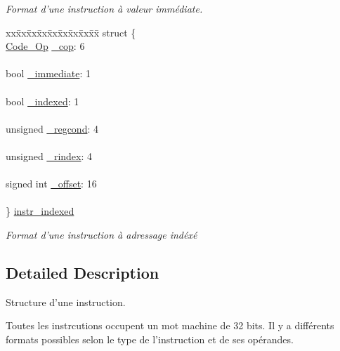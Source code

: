 \begin{DoxyCompactItemize}
\begin{tabbing}
\end{tabbing}\begin{DoxyCompactList}\small\item\em \-Format d'une instruction à valeur immédiate. \end{DoxyCompactList}\item 
\begin{tabbing}
xx\=xx\=xx\=xx\=xx\=xx\=xx\=xx\=xx\=\kill
struct \{\\
\>\hyperlink{instruction_8h_a5ead9d7413d75b14e895c945daa82de6}{Code\_Op} \hyperlink{union_instruction_a2eef4c29da07a7afefa510530aeabe8b}{\_cop}: 6\\
\>\\
\>bool \hyperlink{union_instruction_ae8f0aed9ccc5cc06e0689f32c409787d}{\_immediate}: 1\\
\>\\
\>bool \hyperlink{union_instruction_a49ff74dcae74d84b5fce96090bcbcd14}{\_indexed}: 1\\
\>\\
\>unsigned \hyperlink{union_instruction_aacc0d299ebbd857ec008b3c9e2ae2cd0}{\_regcond}: 4\\
\>\\
\>unsigned \hyperlink{union_instruction_a5b83cbbfd9b2a340e978069a3607a680}{\_rindex}: 4\\
\>\\
\>signed int \hyperlink{union_instruction_af20114f4f10437752340dc9d6a078547}{\_offset}: 16\\
\>\\
\} \hyperlink{union_instruction_ab483163ca6ac7161f93c94601563ccad}{instr\_indexed}\\

\end{tabbing}\begin{DoxyCompactList}\small\item\em \-Format d'une instruction à adressage indéxé \end{DoxyCompactList}\end{DoxyCompactItemize}


\subsection{\-Detailed \-Description}
\-Structure d'une instruction. 

\-Toutes les instrcutions occupent un mot machine de 32 bits. \-Il y a différents formats possibles selon le type de l'instruction et de ses opérandes.


